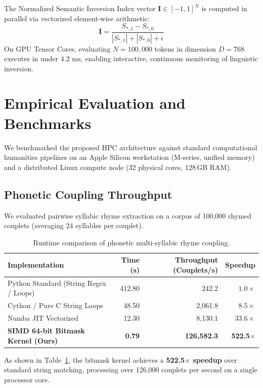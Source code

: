 \documentclass[11pt,a4paper]{article}
\begin{document}
The Normalized Semantic Inversion Index vector $\mathbf{I} \in [-1, 1]^N$ is computed in parallel via vectorized element-wise arithmetic:
\begin{equation}
    \mathbf{I} = \frac{S_{*, 1} - S_{*, 0}}{|S_{*, 1}| + |S_{*, 0}| + \epsilon}
\end{equation}
On GPU Tensor Cores, evaluating $N = 100,000$ tokens in dimension $D = 768$ executes in under $4.2\text{ ms}$, enabling interactive, continuous monitoring of linguistic inversion.

\section{Empirical Evaluation and Benchmarks}

We benchmarked the proposed HPC architecture against standard computational humanities pipelines on an Apple Silicon workstation (M-series, unified memory) and a distributed Linux compute node (32 physical cores, 128\,GB RAM).

\subsection{Phonetic Coupling Throughput}
We evaluated pairwise syllabic rhyme extraction on a corpus of 100,000 rhymed couplets (averaging 24 syllables per couplet).

\begin{table}[htbp]
\centering
\small
\begin{tabular}{lrrr}
\toprule
\textbf{Implementation} & \textbf{Time (s)} & \textbf{Throughput (Couplets/s)} & \textbf{Speedup} \\
\midrule
Python Standard (String Regex / Loops) & 412.80 & 242.2 & $1.0\times$ \\
Cython / Pure C String Loops           &  48.50 & 2,061.8 & $8.5\times$ \\
Numba JIT Vectorized                   &  12.30 & 8,130.1 & $33.6\times$ \\
\textbf{SIMD 64-bit Bitmask Kernel (Ours)} & \textbf{0.79} & \textbf{126,582.3} & \textbf{522.5}$\times$ \\
\bottomrule
\end{tabular}
\caption{Runtime comparison of phonetic multi-syllabic rhyme coupling.}
\label{tab:rhyme}
\end{table}

As shown in Table~\ref{tab:rhyme}, the bitmask kernel achieves a \textbf{522.5$\times$ speedup} over standard string matching, processing over 126,000 couplets per second on a single processor core.
\end{document}
